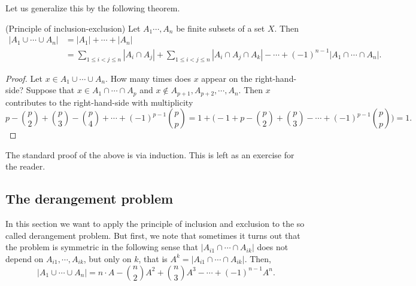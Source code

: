 Let us generalize this by the following theorem.

\begin{theorem}(Principle of inclusion-exclusion)
Let $A_1\cdots, A_n$ be finite subsets of a set $X$. Then 
\begin{align*}
|A_1 \cup \cdots \cup A_n|&=|A_1|+\cdots+|A_n|\\
&=\sum_{1 \leq i < j \leq n} |A_i \cap A_j|+\sum_{1 \leq i < j \leq n} |A_i \cap A_j \cap A_k| - \cdots + (-1)^{n-1}|A_1 \cap \cdots \cap A_n|.
\end{align*}
\end{theorem}

\begin{proof}
Let $x \in A_1 \cup \cdots \cup A_n$. How many times does $x$ appear on the right-hand-side? Suppose that $x \in A_1 \cap \cdots \cap A_p$ and 
$x \notin A_{p+1}, A_{p+2}, \cdots, A_n$. Then $x$ contributes to the right-hand-side with multiplicity 
$$
p- {p \choose 2} + {p \choose 3} - {p \choose 4} + \cdots + (-1)^{p-1} {p \choose p}=1+\biggl(-1 +p- {p \choose 2} + {p \choose 3} - \cdots + (-1)^{p-1} {p \choose p} \biggr )=1.
$$
\end{proof}

The standard proof of the above is via induction. This is left as an exercise for the reader.

\subsection{The derangement problem}

In this section we want to apply the principle of inclusion and exclusion to the so called derangement problem. But first, we note that sometimes it turns out that the 
problem is symmetric in the following sense that $|A_{i1} \cap \cdots \cap A_{ik}|$ does not depend on $A_{i1}, \cdots, A_{ik}$, but only on $k$, that is $A^k=|A_{i1} \cap \cdots \cap A_{ik}|$. 
Then, 
$$
|A_1 \cup \cdots \cup A_n|=n \cdot A - {n \choose 2} A^2 + {n \choose 3} A^3 - \cdots + (-1)^{n-1} A^n.
$$

